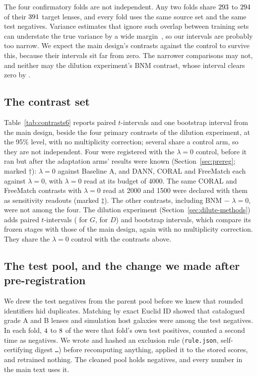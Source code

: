 The four confirmatory folds are not independent. Any two folds share $293{}$
to $294{}$ of their $391{}$ target lenses, and every fold uses
the same source set and the same test negatives. Variance estimates that ignore such overlap
between training sets can understate the true variance by a wide
margin~\citep{bengio2004, nadeau2003}, so our intervals are probably too narrow. We expect the
main design's contrasts against the control to survive this, because their intervals sit far
from zero. The narrower comparisons may not, and neither may the dilution experiment's BNM
contrast, whose interval clears zero by \dlGBnmLoAbsThree{}.

\subsection{The contrast set}

Table~\ref{tab:contrasts6} reports \contrastCount{} paired $t$-intervals and one bootstrap interval from the main design, beside
the four primary contrasts of the dilution experiment, at the 95\% level, with no
multiplicity correction; several share a control arm, so they are not independent. Four were
registered with the $\lambda=0$ control, before it ran but after the adaptation arms' results
were known (Section~\ref{sec:prereg}; marked $\dagger$): $\lambda=0$ against Baseline A,
and DANN, CORAL and FreeMatch each against $\lambda=0$, with $\lambda=0$ read at its budget of
4000. The same CORAL and FreeMatch contrasts with $\lambda=0$ read at 2000 and 1500 were
declared with them as sensitivity readouts (marked $\ddagger$). The other contrasts, including
BNM $-$ $\lambda=0$, were not among the four. The dilution experiment
(Section~\ref{sec:dilute-methods}) adds \dlNtWord{} paired $t$-intervals (\dlNtG{} for $G$,
\dlNtD{} for $D$) and \dlNbootWord{} bootstrap intervals, which compare its frozen stages with
those of the main design, again with no multiplicity correction. They share the $\lambda=0$
control with the contrasts above.

\subsection{The test pool, and the change we made after pre-registration}
\label{sec:testpool}

We drew the test negatives from the parent pool before we knew that rounded identifiers hid
duplicates. Matching by exact Euclid ID showed that \DOneLensNeg{} catalogued grade A and B
lenses and \DOneDeflNeg{} simulation host galaxies were among the \TestNegDrawn{} test
negatives. In each fold, $4{}$ to $8{}$ of the \DOneLensNeg{} were that fold's own
test positives, counted a second time as negatives. We wrote and hashed an exclusion rule
(\texttt{rule.json}, self-certifying digest \texttt{\rvRuleSha{}\ldots}) before recomputing anything, applied
it to the stored scores, and retrained nothing. The cleaned pool holds \TestNegDOne{}
negatives, and every number in the main text uses it.


